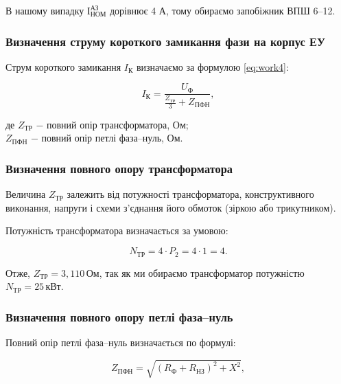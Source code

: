 В нашому випадку $\text{І}^{\text{АЗ}}_{\text{НОМ}}$ дорівнює 4 А, тому обираємо запобіжник ВПШ 6–12.

\subsubsection{Визначення струму короткого замикання фази на корпус ЕУ}

Струм короткого замикання $I_{\text{К}}$ визначаємо за формулою \ref{eq:work4}:

\begin{equation}\label{eq:work4}
	I_{\text{К}} = \frac{U_{\text{Ф}}}{\frac{Z_{\text{ТР}}}{3} + Z_{\text{ПФН}}},
\end{equation}

\noindent де $Z_{\text{ТР}}$ $-$ повний опір трансформатора, Ом; \\
\hspace*{15pt} $Z_{\text{ПФН}}$ $-$ повний опір петлі фаза–нуль, Ом.

\vspace{1.5em}

\subsubsection{Визначення повного опору трансформатора}

Величина $Z_{\text{ТР}}$ залежить від потужності трансформатора, конструктивного виконання, напруги і схеми з'єднання його обмоток (зіркою або трикутником).

Потужність трансформатора визначається за умовою:

\[
	N_{\text{ТР}} = 4 \cdot P_{2} = 4 \cdot 1 = 4.
\]

\vspace{1.5em}

Отже,  $Z_{\text{ТР}} = 3,110 \, \text{Ом}$,  так як  ми обираємо  трансформатор  потужністю $N_{\text{ТР}} = 25 \, \text{кВт}$.

\subsubsection{Визначення повного опору петлі фаза–нуль}

Повний опір петлі фаза–нуль визначається по формулі:

\begin{equation}\label{eq:work6}
	Z_{\text{ПФН}} = \sqrt{(R_{\text{Ф}} + R_{\text{НЗ}})^{2} + X^{2}},
\end{equation}


